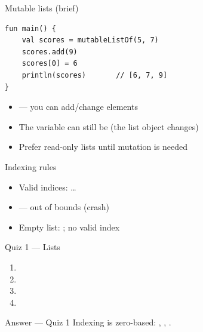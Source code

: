 \documentclass[aspectratio=169,11pt]{beamer}
\begin{document}
    \begin{frame}[fragile]{Mutable lists (brief)}
        \begin{lstlisting}
fun main() {
    val scores = mutableListOf(5, 7)
    scores.add(9)
    scores[0] = 6
    println(scores)       // [6, 7, 9]
}
        \end{lstlisting}
        \vspace{0.3em}
        \begin{itemize}
            \item {} --- you can add/change elements
            \item The variable can still be  (the list object changes)
            \item Prefer read-only lists until mutation is needed
        \end{itemize}
    \end{frame}

    \begin{frame}{Indexing rules}
        \begin{itemize}
            \item Valid indices:  \ldots\ 
            \item {} --- out of bounds (crash)
            \item Empty list: ; no valid index
        \end{itemize}
        \vspace{0.5em}
    \end{frame}

    \begin{frame}{Quiz 1 --- Lists}
        \begin{enumerate}
            \item {}
            \item {}
            \item {}
            \item {}
        \end{enumerate}
        \quizpause
    \end{frame}

    \begin{frame}{Answer --- Quiz 1}
        \vspace{0.4em}
        Indexing is zero-based: , , .
    \end{frame}
\end{document}
